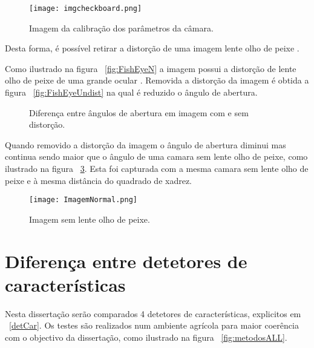 \begin{figure}[h!]  %
	\centering
	\texttt{[image: imgcheckboard.png]} 
	\caption{Imagem da calibração dos parâmetros da câmara.}
	\label{fig:imgcheckboard}  %
\end{figure}


Desta forma, é possível retirar a distorção de uma imagem lente olho de peixe . 



Como ilustrado na figura ~\ref{fig:FishEyeN} a imagem possui a distorção de lente olho de peixe  de uma grande ocular .  Removida a distorção da imagem é obtida a figura ~\ref{fig:FishEyeUndist} na qual é reduzido o ângulo de abertura.

\begin{figure}[h!]
	\centering
	\qquad
	\caption{Diferença entre ângulos de abertura em imagem com e sem distorção.}\label{fig:FisheEye}
\end{figure}


Quando removido a distorção da imagem o ângulo de abertura diminui mas continua sendo maior que o ângulo de uma camara sem lente olho de peixe, como ilustrado na figura ~\ref{fig:ImageNorm}. Esta foi capturada com a mesma camara sem lente olho de peixe e à mesma distância do quadrado de xadrez.

\begin{figure}[h!]
	\centering
	\label{fig:ImageNorm}
	\texttt{[image: ImagemNormal.png]}
	\caption{Imagem sem lente olho de peixe.}
\end{figure}







\section{Diferença entre detetores de características}

Nesta dissertação serão comparados 4 detetores de características, explicitos em  ~\ref{detCar}. Os testes são realizados num ambiente agrícola para maior coerência com o objectivo da dissertação, como ilustrado na figura ~\ref{fig:metodosALL}.




